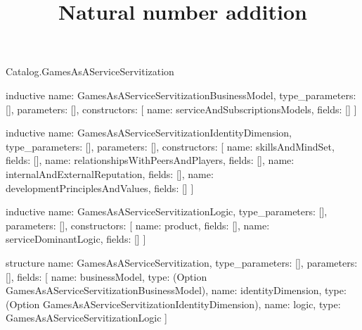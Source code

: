\begin{lexlean}{Catalog.GamesAsAServiceServitization}
\title{Natural number addition}
\begin{semanticmodule}
inductive{
  name: GamesAsAServiceServitizationBusinessModel,
  type_parameters: [],
  parameters: [],
  constructors: [
    {name: serviceAndSubscriptionsModels, fields: []}
  ]
}

inductive{
  name: GamesAsAServiceServitizationIdentityDimension,
  type_parameters: [],
  parameters: [],
  constructors: [
    {name: skillsAndMindSet, fields: []},
    {name: relationshipsWithPeersAndPlayers, fields: []},
    {name: internalAndExternalReputation, fields: []},
    {name: developmentPrinciplesAndValues, fields: []}
  ]
}

inductive{
  name: GamesAsAServiceServitizationLogic,
  type_parameters: [],
  parameters: [],
  constructors: [
    {name: product, fields: []},
    {name: serviceDominantLogic, fields: []}
  ]
}

structure{
  name: GamesAsAServiceServitization,
  type_parameters: [],
  parameters: [],
  fields: [
    {name: businessModel, type: (Option GamesAsAServiceServitizationBusinessModel)},
    {name: identityDimension, type: (Option GamesAsAServiceServitizationIdentityDimension)},
    {name: logic, type: GamesAsAServiceServitizationLogic}
  ]
}
\end{semanticmodule}
\end{lexlean}
